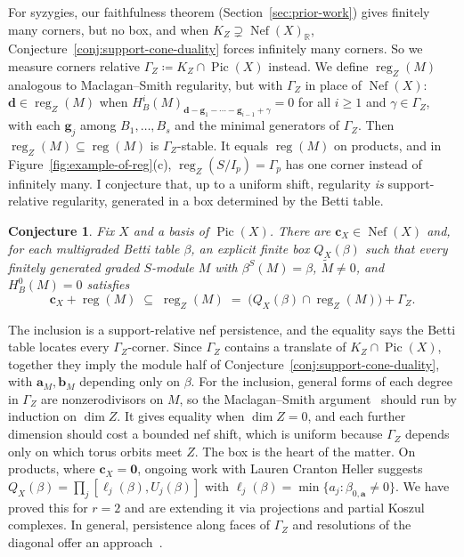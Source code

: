 \documentclass[11pt,reqno]{amsart}
\newtheorem{conjecture}[lemma]{Conjecture}
\theoremstyle{remark}
\newcommand{\reg}{\operatorname{reg}}
\newcommand{\Pic}{\operatorname{Pic}}
\newcommand{\Nef}{\operatorname{Nef}}
\renewcommand{\aa}{\mathbf{a}}
\newcommand{\bb}{\mathbf{b}}
\newcommand{\dd}{\mathbf{d}}
\newcommand{\zero}{\mathbf{0}}
\newcommand{\RR}{\mathbb{R}}
\begin{document}
For syzygies, our faithfulness theorem (Section~\ref{sec:prior-work}) gives finitely many corners, but no box, and when $K_Z\supsetneq\Nef(X)_{\RR}$, Conjecture~\ref{conj:support-cone-duality} forces infinitely many corners. So we measure corners relative $\Gamma_Z\coloneqq K_{Z}\cap \Pic(X)$ instead. We define $\reg_Z(M)$ analogous to Maclagan--Smith regularity, but with $\Gamma_Z$ in place of $\Nef(X)$: $\dd\in\reg_Z(M)$ when $H_B^i(M)_{\dd-\mathbf g_1-\cdots-\mathbf g_{i-1}+\gamma}=0$ for all $i\ge1$ and $\gamma\in\Gamma_Z$, with each $\mathbf g_j$ among $B_1,\ldots,B_s$ and the minimal generators of $\Gamma_Z$. Then $\reg_Z(M)\subseteq\reg(M)$ is $\Gamma_Z$-stable. It equals $\reg(M)$ on products, and in Figure~\ref{fig:example-of-reg}(c), $\reg_Z(S/I_p)=\Gamma_p$ has one corner instead of infinitely many. I conjecture that, up to a uniform shift, regularity \emph{is} support-relative regularity, generated in a box determined by the Betti table.
 
\begin{conjecture}\label{conj:betti-boxes}
Fix $X$ and a basis of $\Pic(X)$. There are $\mathbf c_X\in\Nef(X)$ and, for each multigraded Betti table $\beta$, an explicit finite box $Q_X(\beta)$ such that every finitely generated graded $S$-module $M$ with $\beta^S(M)=\beta$, $\widetilde M\ne0$, and $H_B^0(M)=0$ satisfies
\[
\mathbf c_X+\reg(M)\;\subseteq\;\reg_Z(M)\;=\;\big(Q_X(\beta)\cap\reg_Z(M)\big)+\Gamma_Z.
\]
\end{conjecture}
 
The inclusion is a support-relative nef persistence, and the equality says the Betti table locates every $\Gamma_Z$-corner. Since $\Gamma_Z$ contains a translate of $K_Z\cap\Pic(X)$, together they imply the module half of Conjecture~\ref{conj:support-cone-duality}, with $\aa_M,\bb_M$ depending only on $\beta$. For the inclusion, general forms of each degree in $\Gamma_Z$ are nonzerodivisors on $M$, so the Maclagan--Smith argument~\cite{maclaganSmith04} should run by induction on $\dim Z$. It gives equality when $\dim Z=0$, and each further dimension should cost a bounded nef shift, which is uniform because $\Gamma_Z$ depends only on which torus orbits meet $Z$. The box is the heart of the matter. On products, where $\mathbf c_X=\zero$, ongoing work with Lauren Cranton Heller suggests $Q_X(\beta)=\prod_{j}[\ell_j(\beta),U_j(\beta)]$ with $\ell_j(\beta)=\min\{a_j:\beta_{0,\aa}\ne0\}$. We have proved this for $r=2$ and are extending it via projections and partial Koszul complexes. In general, persistence along faces of $\Gamma_Z$ and resolutions of the diagonal offer an approach~\cite{botbolChardin17,HHL24,brownSayrafi24}.
 
\end{document}
